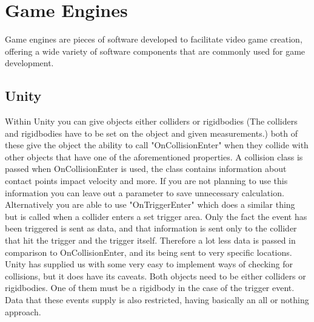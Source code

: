 \documentclass{scrartcl}
\begin{document}
	
	\section{Game Engines}
	Game engines are pieces of software developed to facilitate video game creation, offering a wide variety of software components that are commonly used for game development\cite{polanvcec2017developing}.
	\subsection{Unity}
	Within Unity you can give objects either colliders or rigidbodies (The colliders and rigidbodies have to be set on the object and given measurements.) both of these give the object the ability to call "OnCollisionEnter" when they collide with other objects that have one of the aforementioned properties\cite{UnityCollision}. A collision class is passed when OnCollisionEnter is used, the class contains information about contact points impact velocity and more. If you are not planning to use this information you can leave out a parameter to save unnecessary calculation\cite{UnityCollision}. Alternatively you are able to use "OnTriggerEnter" which does a similar thing but is called when a collider enters a set trigger area. Only the fact the event has been triggered is sent as data, and that information is sent only to the collider that hit the trigger and the trigger itself\cite{UnityTrigger}. Therefore a lot less data is passed in comparison to OnCollisionEnter, and its being sent to very specific locations. Unity has supplied us with some very easy to implement ways of checking for collisions, but it does have its caveats. Both objects need to be either colliders or rigidbodies. One of them must be a rigidbody in the case of the trigger event\cite{UnityTrigger}. Data that these events supply is also restricted, having basically an all or nothing approach.
	
\end{document}
